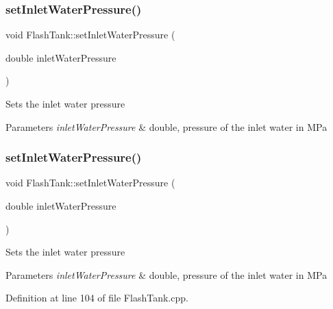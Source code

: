 \subsubsection{\texorpdfstring{set\+Inlet\+Water\+Pressure()}{setInletWaterPressure()}\hspace{0.1cm}{\footnotesize\ttfamily [1/3]}}
{\footnotesize\ttfamily void Flash\+Tank\+::set\+Inlet\+Water\+Pressure (\begin{DoxyParamCaption}\item[{double}]{inlet\+Water\+Pressure }\end{DoxyParamCaption})}

Sets the inlet water pressure 
\begin{DoxyParams}{Parameters}
{\em inlet\+Water\+Pressure} & double, pressure of the inlet water in M\+Pa \\
\hline
\end{DoxyParams}
\mbox{\label{class_flash_tank_aed0991a7902401d110fb2f4b472326f5}} 
\subsubsection{\texorpdfstring{set\+Inlet\+Water\+Pressure()}{setInletWaterPressure()}\hspace{0.1cm}{\footnotesize\ttfamily [2/3]}}
{\footnotesize\ttfamily void Flash\+Tank\+::set\+Inlet\+Water\+Pressure (\begin{DoxyParamCaption}\item[{double}]{inlet\+Water\+Pressure }\end{DoxyParamCaption})}

Sets the inlet water pressure 
\begin{DoxyParams}{Parameters}
{\em inlet\+Water\+Pressure} & double, pressure of the inlet water in M\+Pa \\
\hline
\end{DoxyParams}


Definition at line 104 of file Flash\+Tank.\+cpp.

\mbox{\label{class_flash_tank_aed0991a7902401d110fb2f4b472326f5}} 

